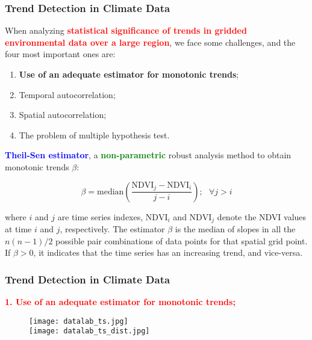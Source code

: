 \documentclass[11pt]{beamer}
\begin{document}
\begin{frame}[fragile]
  \frametitle{\normalsize{\textbf{
    Trend Detection in Climate Data
  }}} 

  \scriptsize{  

    \textbullet \: When analyzing \textbf{\textcolor{red}{statistical 
    significance of trends in gridded environmental data over a large region}}, 
    we face some challenges, and the four most important ones are: 
    
    \begin{enumerate}
    \item \textbf{Use of an adequate estimator for monotonic trends};
    \item Temporal autocorrelation;
    \item Spatial autocorrelation;
    \item The problem of multiple hypothesis test.  
    \end{enumerate}

    \textbullet \: \textbf{\textcolor{blue}{Theil-Sen estimator}}, 
    a \textbf{\textcolor{green}{non-parametric}} robust analysis method to 
    obtain monotonic trends $\beta$:

    \begin{equation*}
      \boxed{
        \beta = \text{median} \left( \frac{\text{NDVI}_j - \text{NDVI}_i}{j - i}
        \right); \: \: \: \forall j > i
      }
    \end{equation*}

    where $i$ and $j$ are time series indexes, $\text{NDVI}_i$ and 
    $\text{NDVI}_j$ denote the NDVI values at time $i$ and $j$, respectively. 
    The estimator $\beta$ is the median of slopes in all the $n (n - 1) / 2$ 
    possible pair combinations of data points for that spatial grid point. 
    If $\beta > 0$, it indicates that the time series has an increasing 
    trend, and vice-versa.

  }
\end{frame}

\begin{frame}[fragile]
  \frametitle{\normalsize{\textbf{
    Trend Detection in Climate Data
  }}} 

  \scriptsize{  

    \textbf{\textcolor{red}{
      1. Use of an adequate estimator for monotonic trends;
    }}

    \begin{figure}[h!]
      \centering
      \texttt{[image: datalab\_ts.jpg]} \\
      \texttt{[image: datalab\_ts\_dist.jpg]}
    \end{figure}

  }
\end{frame}
\end{document}

